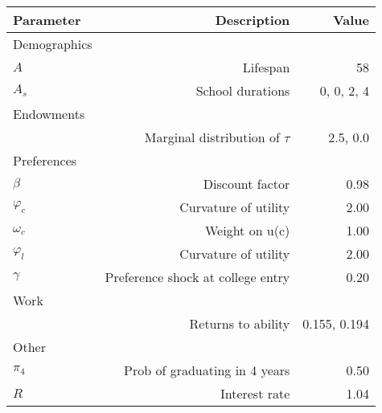 \begin{tabular}{lrr}
\hline
Parameter & Description  & Value  \\ 
\hline
Demographics &   &   \\ 
$A$ & Lifespan  & 58  \\ 
$A_{s}$ & School durations  & 0, 0, 2, 4  \\ 
Endowments &   &   \\ 
 & Marginal distribution of $\tau$  & 2.5, 0.0  \\ 
Preferences &   &   \\ 
$\beta$ & Discount factor  & 0.98  \\ 
$\varphi_{c}$ & Curvature of utility  & 2.00  \\ 
$\omega_{c}$ & Weight on u(c)  & 1.00  \\ 
$\varphi_{l}$ & Curvature of utility  & 2.00  \\ 
$\gamma$ & Preference shock at college entry  & 0.20  \\ 
Work &   &   \\ 
 & Returns to ability  & 0.155, 0.194  \\ 
Other &   &   \\ 
$\pi_{4}$ & Prob of graduating in 4 years  & 0.50  \\ 
$R$ & Interest rate  & 1.04  \\ 
\hline
\end{tabular}%
